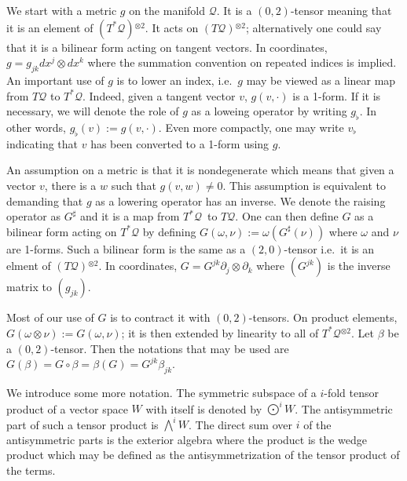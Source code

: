 \documentclass[11pt]{article}
\theoremstyle{remark}
\begin{document}
We start with a metric $g$ on the manifold \ensuremath{\mathcal{Q}}. It is a 
$(0,2)$-tensor meaning that it is an element of $(\ensuremath{T^{*} \ensuremath{\mathcal{Q}}})\ensuremath{^{\otimes 2} }$. It acts
on $(\ensuremath{T \ensuremath{\mathcal{Q}}})\ensuremath{^{\otimes 2} }$; alternatively one could say that it is a bilinear form
acting on tangent vectors. In coordinates, $ g = g_{\ensuremath{j} \ensuremath{k}}
dx^{\ensuremath{j}} \otimes dx^{\ensuremath{k}}$ where the summation convention on
repeated indices is implied. An important use of $g$ is to lower an index,
i.e.\ $g$ may be viewed as a linear map  from $\ensuremath{T \ensuremath{\mathcal{Q}}}$ to $\ensuremath{T^{*} \ensuremath{\mathcal{Q}}}$. Indeed,
given a tangent vector $v$, $g(v, \cdot)$ is a 1-form. If it is
necessary, we will denote the role of $g$ as a loweing operator by
writing $g_{\flat}$. In other words, $g_{\flat}(v) \ensuremath{:=} g(v,
\cdot)$. Even more compactly, one may write $v_{\flat}$ indicating
that $v$ has been converted to a 1-form using $g$.

An assumption
on a metric is that it is nondegenerate which means that given a
vector $v$, there is a $w$ such that $g(v,w) \neq 0$. This assumption
is equivalent to demanding that $g$ as a lowering operator has an
inverse. We denote the raising operator as $G^{\sharp}$ and it is a map from
\ensuremath{T^{*} \ensuremath{\mathcal{Q}}}\ to \ensuremath{T \ensuremath{\mathcal{Q}}}. One can then define $G$ as a bilinear form acting on
$\ensuremath{T^{*} \ensuremath{\mathcal{Q}}}$ by defining $G(\omega, \nu) \ensuremath{:=} \omega(G^{\sharp}(\nu))$ where
$\omega$ and $\nu$ are 1-forms. Such a bilinear form is the same as a
$(2,0)$-tensor i.e.\ it is an elment of $(\ensuremath{T \ensuremath{\mathcal{Q}}}) \ensuremath{^{\otimes 2} }$. In coordinates,
$G = G^{\ensuremath{j} \ensuremath{k}} \partial_{\ensuremath{j}} \otimes \partial_{\ensuremath{k}}$
where $(G^{\ensuremath{j} \ensuremath{k}})$ is the inverse matrix to $(g_{\ensuremath{j}
  \ensuremath{k}})$. 

Most of our use of $G$ is to contract it with $(0,2)$-tensors. On
product elements, $G(\omega \otimes \nu) \ensuremath{:=} G(\omega, \nu)$; it is
then extended by linearity to all of $\ensuremath{T^{*} \ensuremath{\mathcal{Q}}}\ensuremath{^{\otimes 2} }$. Let $\beta$ be a
$(0,2)$-tensor. Then the notations that may be used are $G(\beta) = G
\circ \beta = \beta(G) = G^{\ensuremath{j} \ensuremath{k}} \beta_{\ensuremath{j} \ensuremath{k}}$.    


We introduce some more notation. The
symmetric subspace of a $i$-fold tensor product of a vector space $W$
with itself is denoted by $\ensuremath{\bigodot^{i}{W}}$. The antisymmetric part of such
a tensor product is $\ensuremath{\bigwedge^{i}{W}}$. The direct sum over $i$ of the antisymmetric
parts is the exterior algebra where the product is the wedge product
which may be defined as the antisymmetrization of the tensor product
of the terms. 
\end{document}
